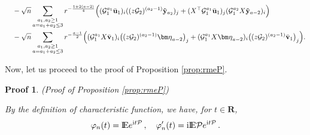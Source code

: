 \documentclass[12pt]{article}
\numberwithin{equation}{section}
\newtheorem{myPro}{Proof}
\theoremstyle{remark}
\newcommand{\1}{{\rm 1}\kern-0.24em{\rm I}}
\newcommand{\E}{{\rm I}\kern-0.18em{\rm E}}
\begin{document}
\begin{appendices}
\begin{align}
&\quad - \sqrt n\sum_{\begin{subarray}{c} a_1, a_2\geq 1\\ a=a_1+a_2\leq3\end{subarray}}
 r^{-\frac{1+2(a-2)}{4}}\Big( (\mathcal{G}_1^{a_1}\bar{\bf u}_1)_{i}((z \mathcal{G}_2)^{(a_2-1)}\tilde{{\bf y}}_{a_2})_j +
  ({X}^{\top}\mathcal{G}_1^{a_1}\bar{\bf u}_1)_{j}( \mathcal{G}_1^{a_2}{X}\tilde{{\bf y}}_{a-2})_i\Big)\notag\\
&\quad - {\sqrt n} \sum_{\begin{subarray}{c} a_1, a_2\geq 1\\ a=a_1+a_2\leq3\end{subarray}} r^{-\frac{a-1}{2}}
 \Big( (\mathcal{G}_1^{a_1}{X}\bar{\bf v}_1)_i \big((z\mathcal{G}_2)^{(a_2-1)}{\bm \eta}_{a-2}\big)_j + (\mathcal{G}_1^{a_1}{X}{\bm \eta}_{a-2})_i \big((z\mathcal{G}_2)^{(a_2-1)}\bar{\bf v}_1\big)_j\Big).
 \end{align}
 
 
 Now, let us proceed to the proof of Proposition  \ref{prop:rmeP}.
   \begin{myPro}{(Proof of Proposition  \ref{prop:rmeP})}
   
   
 By the definition of characteristic function, we have, for $t\in \mathbf{R}$, 
  \begin{align*}
  \varphi_n(t) = \E e^{\mathrm{i} t \mathcal{P}}\,, \quad \varphi_n'(t) = \mathrm{i} \E \mathcal{P} e^{\mathrm{i} t \mathcal{P}}\,.
  \end{align*}
  

\end{myPro}
\end{appendices}
\end{document}
